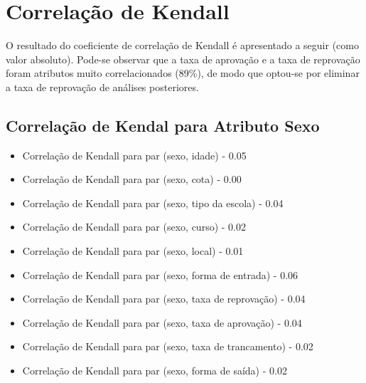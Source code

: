 \section{Correlação de Kendall}
O resultado do coeficiente de correlação de Kendall é apresentado a seguir (como
valor absoluto). Pode-se observar que a taxa de aprovação e a taxa de reprovação
foram atributos muito correlacionados (89\%), de modo que optou-se por eliminar a taxa de
reprovação de análises posteriores. 

\subsection{Correlação de Kendal para Atributo Sexo}
\begin{itemize}
    \item Correlação de Kendall para par (sexo, idade) - 0.05
    \item Correlação de Kendall para par (sexo, cota) - 0.00
    \item Correlação de Kendall para par (sexo, tipo da escola) - 0.04
    \item Correlação de Kendall para par (sexo, curso) - 0.02
    \item Correlação de Kendall para par (sexo, local) - 0.01
    \item Correlação de Kendall para par (sexo, forma de entrada) - 0.06
    \item Correlação de Kendall para par (sexo, taxa de reprovação) - 0.04
    \item Correlação de Kendall para par (sexo, taxa de aprovação) - 0.04
    \item Correlação de Kendall para par (sexo, taxa de trancamento) - 0.02
    \item Correlação de Kendall para par (sexo, forma de saída) - 0.02
\end{itemize}

